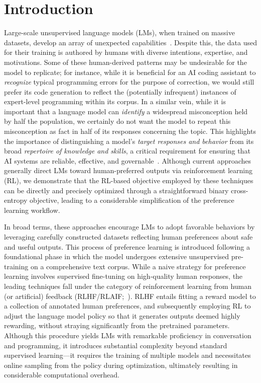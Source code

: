 \section{Introduction}
Large-scale unsupervised language models (LMs), when trained on massive datasets, develop an array of unexpected capabilities~\citep{chowdhery2022palm, brown2020language, touvron2023llama,bubeck2023sparks}. Despite this, the data used for their training is authored by humans with diverse intentions, expertise, and motivations. Some of these human-derived patterns may be undesirable for the model to replicate; for instance, while it is beneficial for an AI coding assistant to \textit{recognize} typical programming errors for the purpose of correction, we would still prefer its code generation to reflect the (potentially infrequent) instances of expert-level programming within its corpus. In a similar vein, while it is important that a language model can \textit{identify} a widespread misconception held by half the population, we certainly do not want the model to repeat this misconception as fact in half of its responses concerning the topic. This highlights the importance of distinguishing a model’s \emph{target responses and behavior} from its broad \textit{repertoire of knowledge and skills}, a critical requirement for ensuring that AI systems are reliable, effective, and governable~\citep{ouyang2022training}. Although current approaches generally direct LMs toward human-preferred outputs via reinforcement learning (RL), we demonstrate that the RL-based objective employed by these techniques can be directly and precisely optimized through a straightforward binary cross-entropy objective, leading to a considerable simplification of the preference learning workflow.

In broad terms, these approaches encourage LMs to adopt favorable behaviors by leveraging carefully constructed datasets reflecting human preferences about safe and useful outputs. This process of preference learning is introduced following a foundational phase in which the model undergoes extensive unsupervised pre-training on a comprehensive text corpus. While a naive strategy for preference learning involves supervised fine-tuning on high-quality human responses, the leading techniques fall under the category of reinforcement learning from human (or artificial) feedback (RLHF/RLAIF;~\citep{christiano2017deep,bai2022constitutional}). RLHF entails fitting a reward model to a collection of annotated human preferences, and subsequently employing RL to adjust the language model policy so that it generates outputs deemed highly rewarding, without straying significantly from the pretrained parameters. Although this procedure yields LMs with remarkable proficiency in conversation and programming, it introduces substantial complexity beyond standard supervised learning—it requires the training of multiple models and necessitates online sampling from the policy during optimization, ultimately resulting in considerable computational overhead.

